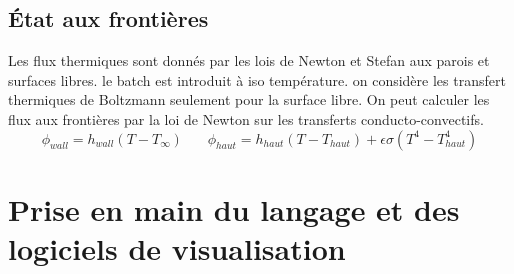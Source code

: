 \documentclass[12pt, a4paper, french, BCOR = 0pt, DIV = 10]{scrartcl}
\begin{document}
	\subsection{État aux frontières}
	
	Les flux thermiques sont donnés par les lois de Newton et Stefan aux parois et surfaces libres. le batch est introduit à iso température. on considère les transfert thermiques de Boltzmann seulement pour la surface libre.
	On peut calculer les flux aux frontières par la loi de Newton sur les transferts conducto-convectifs.\\ 
	\centering
	$$
	\phi_{wall} = h_{wall} (T - T_{\infty}) ~~~~~~~~	
	\phi_{haut} = h_{haut} (T - T_{haut}) + \epsilon \sigma (T^4 - T_{haut}^4)
	$$
	
	\section{Prise en main du langage et des logiciels de visualisation}
 
	
	
\end{document}

